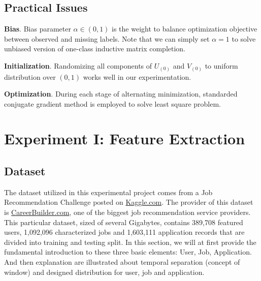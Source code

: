 \documentclass{article} %
\begin{document}
\subsection{Practical Issues}
\textbf{Bias}. Bias parameter $\alpha \in (0, 1)$ is the weight to balance
optimization objective between observed and missing labels. Note that we can
simply set $\alpha = 1$ to solve unbiased version of one-class inductive matrix completion.

\textbf{Initialization}. Randomizing all components of $U_{(0)}$ and
$V_{(0)}$ to uniform distribution over $(0, 1)$ works well in our
experimentation. 

\textbf{Optimization}.
During each stage of alternating minimization, standarded conjugate gradient method is
employed to solve least square problem. 

\section{Experiment I: Feature Extraction} %
\subsection{Dataset}
The dataset utilized in this experimental project comes from a Job
Recommendation Challenge posted on
\href{http://www.kaggle.com/c/job-recommendation/data}{Kaggle.com}. The
provider of this dataset is
\href{http://www.careerbuilder.com/}{CareerBuilder.com}, one of the biggest
job recommendation service providers. This particular dataset, sized of several
Gigabytes, contains 389,708 featured users, 1,092,096
characterized jobs and 1,603,111 application records that are divided into
training and testing split.  In this section, we will at first provide the
fundamental introduction to these three basic elements: User, Job,
Application. And then explanation are illustrated about temporal separation (concept of
window) and designed distribution for user, job and application. 
\end{document}
